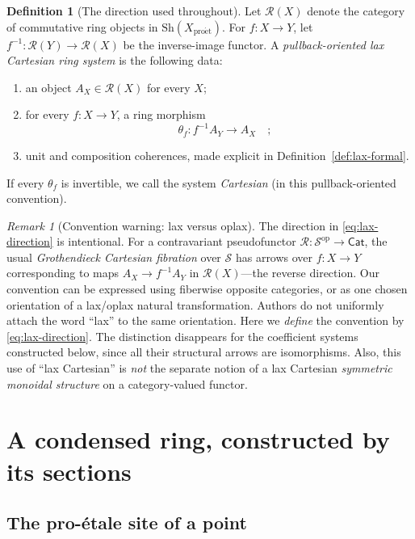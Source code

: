 \documentclass[11pt,a4paper]{article}
\numberwithin{equation}{section}
\theoremstyle{definition}
\newtheorem{definition}[theorem]{Definition}
\theoremstyle{remark}
\newtheorem{remark}[theorem]{Remark}
\newcommand{\Sh}{\mathrm{Sh}}
\newcommand{\proet}{\mathrm{pro\acute{e}t}}
\begin{document}
\begin{definition}[The direction used throughout]\label{def:direction}
Let $\mathscr R(X)$ denote the category of commutative ring objects in
$\Sh(X_{\proet})$.  For $f:X\to Y$, let
$f^{-1}:\mathscr R(Y)\to\mathscr R(X)$ be the inverse-image functor.
A \emph{pullback-oriented lax Cartesian ring system} is the following data:
\begin{enumerate}
\item an object $A_X\in\mathscr R(X)$ for every $X$;
\item for every $f:X\to Y$, a ring morphism
\begin{equation}\label{eq:lax-direction}
     \boxed{\quad\theta_f:f^{-1}A_Y\longrightarrow A_X\quad};
\end{equation}
\item unit and composition coherences, made explicit in
  Definition~\ref{def:lax-formal}.
\end{enumerate}
If every $\theta_f$ is invertible, we call the system
\emph{Cartesian} (in this pullback-oriented convention).
\end{definition}

\begin{remark}[Convention warning: lax versus oplax]\label{rem:convention}
The direction in \eqref{eq:lax-direction} is intentional.  For a
contravariant pseudofunctor $\mathscr R:\mathscr S^{\mathrm{op}}\to\mathsf{Cat}$,
the usual \emph{Grothendieck Cartesian fibration} over $\mathscr S$ has
arrows over $f:X\to Y$ corresponding to maps
$A_X\to f^{-1}A_Y$ in $\mathscr R(X)$---the reverse direction.
Our convention can be expressed using fiberwise opposite categories, or as
one chosen orientation of a lax/oplax natural transformation.
Authors do not uniformly attach the word ``lax'' to the same orientation.
Here we \emph{define} the convention by \eqref{eq:lax-direction}.
The distinction disappears for the coefficient systems constructed below,
since all their structural arrows are isomorphisms.  Also, this use of
``lax Cartesian'' is \emph{not} the separate notion of a lax Cartesian
\emph{symmetric monoidal structure} on a category-valued functor.
\end{remark}

\section{A condensed ring, constructed by its sections}

\subsection{The pro-\'{e}tale site of a point}
\end{document}
